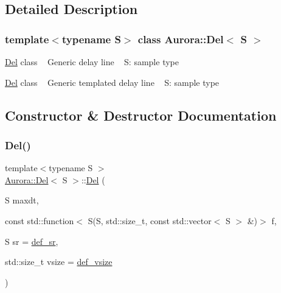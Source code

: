 \subsection{Detailed Description}
\subsubsection*{template$<$typename S$>$\newline
class Aurora\+::\+Del$<$ S $>$}

\hyperlink{class_aurora_1_1_del}{Del} class ~\newline
Generic delay line ~\newline
S\+: sample type

\hyperlink{class_aurora_1_1_del}{Del} class ~\newline
Generic templated delay line ~\newline
S\+: sample type 

\subsection{Constructor \& Destructor Documentation}
\mbox{\label{class_aurora_1_1_del_ad2236892c8f3459010f7570bee8275a1}} 
\subsubsection{\texorpdfstring{Del()}{Del()}\hspace{0.1cm}{\footnotesize\ttfamily [1/3]}}
{\footnotesize\ttfamily template$<$typename S $>$ \\
\hyperlink{class_aurora_1_1_del}{Aurora\+::\+Del}$<$ S $>$\+::\hyperlink{class_aurora_1_1_del}{Del} (\begin{DoxyParamCaption}\item[{S}]{maxdt,  }\item[{const std\+::function$<$ S(S, std\+::size\+\_\+t, const std\+::vector$<$ S $>$ \&)$>$}]{f,  }\item[{S}]{sr = {\ttfamily \hyperlink{namespace_aurora_ad49263d809bea98dd422e95bc91bc03e}{def\+\_\+sr}},  }\item[{std\+::size\+\_\+t}]{vsize = {\ttfamily \hyperlink{namespace_aurora_afaaddf667a06e7ce23c667a8b7295263}{def\+\_\+vsize}} }\end{DoxyParamCaption})\hspace{0.3cm}{\ttfamily [inline]}}

